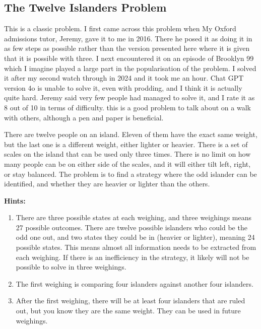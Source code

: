 
\subsection{The Twelve Islanders Problem}

This is a classic problem. I first came across this problem when My Oxford admissions tutor, Jeremy, gave it to me in 2016. There he posed it as doing it in as few steps as possible rather than the version presented here where it is given that it is possible with three. I next encountered it on an episode of Brooklyn 99 which I imagine played a large part in the popularisation of the problem. I solved it after my second watch through in 2024 and it took me an hour. Chat GPT version 4o is unable to solve it, even with prodding, and I think it is actually quite hard. Jeremy said very few people had managed to solve it, and I rate it as 8 out of 10 in terms of difficulty. this is a good problem to talk about on a walk with others, although a pen and paper is beneficial.

There are twelve people on an island. Eleven of them have the exact same weight, but the last one is a different weight, either lighter or heavier. There is a set of scales on the island that can be used only three times. There is no limit on how many people can be on either side of the scales, and it will either tilt left, right, or stay balanced. The problem is to find a strategy where the odd islander can be identified, and whether they are heavier or lighter than the others.

\textbf{Hints:}

\begin{enumerate}
    \item There are three possible states at each weighing, and three weighings means 27 possible outcomes. There are twelve possible islanders who could be the odd one out, and two states they could be in (heavier or lighter), meaning 24 possible states. This means almost all information needs to be extracted from each weighing. If there is an inefficiency in the strategy, it likely will not be possible to solve in three weighings.
    \item The first weighing is comparing four islanders against another four islanders.
    \item After the first weighing, there will be at least four islanders that are ruled out, but you know they are the same weight. They can be used in future weighings.
\end{enumerate}

